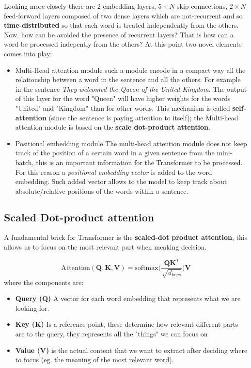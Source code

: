 \noindent
Looking more closely there are 2 embedding layers, $5\times{N}$ skip connections, $2\times{N}$ feed-forward layers composed of two dense layers which are not-recurrent and so \textbf{time-distributed} so that each word is treated independently from the others.\\
Now, how can be avoided the presence of recurrent layers? That is how can a word be processed indepently from the others? At this point two novel elements comes into play:
\begin{itemize}
    \itemsep-0.2em
    \item \textsf{Multi-Head attention module} such a module encode in a compact way all the relationship between a word in the sentence and all the others. For example in the sentence \textit{They welcomed the Queen of the United Kingdom}. The output of this layer for the word "Queen" will have higher weights for the words "United" and "Kingdom" than for other words. This mechanism is called \textbf{self-attention} (since the sentence is paying attention to itself); the Multi-head attention module is based on the \textbf{scale dot-product attention}.
    \item \textsf{Positional embedding module} The multi-head attention module does not keep track of the position of a certain word in a given sentence from the mini-batch, this is an important information for the Transformer to be processed. For this reason a \textit{positional embedding vector} is added to the word embedding. Such added vector allows to the model to keep track about absolute/relative positions of the words within a sentence.
\end{itemize}



\subsection{Scaled Dot-product attention}
A fundamental brick for Transformer is the \textbf{scaled-dot product attention}, this allows us to focus on the most relevant part when meaking decision.

\begin{equation}
    \text{Attention}(\mathbf{Q},\mathbf{K},\mathbf{V})=
    \text{softmax}\bigg(
        \frac{\mathbf{Q}\mathbf{K}^T}{\sqrt{d_{keys}}}
    \bigg)\mathbf{V}
\end{equation}
where the components are:
\begin{itemize}
    \item \textbf{Query (Q)} A vector for each word embedding that represents what we are looking for.
    \item \textbf{Key (K)} Is a reference point, these determine how relevant different parts are to the query, they represents all the "things" we can focus on
    \item \textbf{Value (V)} is the actual content that we want to extract after deciding where to focus (eg. the meaning of the most relevant word).
\end{itemize}

